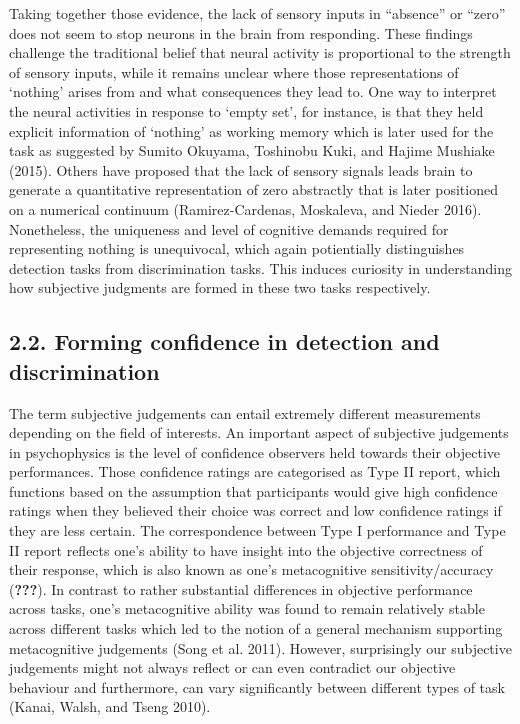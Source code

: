 \documentclass[
]{article}
\begin{document}
Taking together those evidence, the lack of sensory inputs in
``absence'' or ``zero'' does not seem to stop neurons in the brain from
responding. These findings challenge the traditional belief that neural
activity is proportional to the strength of sensory inputs, while it
remains unclear where those representations of `nothing' arises from and
what consequences they lead to. One way to interpret the neural
activities in response to `empty set', for instance, is that they held
explicit information of `nothing' as working memory which is later used
for the task as suggested by Sumito Okuyama, Toshinobu Kuki, and Hajime
Mushiake (2015). Others have proposed that the lack of sensory signals
leads brain to generate a quantitative representation of zero abstractly
that is later positioned on a numerical continuum (Ramirez-Cardenas,
Moskaleva, and Nieder 2016). Nonetheless, the uniqueness and level of
cognitive demands required for representing nothing is unequivocal,
which again potientially distinguishes detection tasks from
discrimination tasks. This induces curiosity in understanding how
subjective judgments are formed in these two tasks respectively.

\hypertarget{forming-confidence-in-detection-and-discrimination}{%
\subsection{2.2. Forming confidence in detection and
discrimination}\label{forming-confidence-in-detection-and-discrimination}}

The term subjective judgements can entail extremely different
measurements depending on the field of interests. An important aspect of
subjective judgements in psychophysics is the level of confidence
observers held towards their objective performances. Those confidence
ratings are categorised as Type II report, which functions based on the
assumption that participants would give high confidence ratings when
they believed their choice was correct and low confidence ratings if
they are less certain. The correspondence between Type I performance and
Type II report reflects one's ability to have insight into the objective
correctness of their response, which is also known as one's
metacognitive sensitivity/accuracy ({\textbf{???}}). In contrast to
rather substantial differences in objective performance across tasks,
one's metacognitive ability was found to remain relatively stable across
different tasks which led to the notion of a general mechanism
supporting metacognitive judgements (Song et al. 2011). However,
surprisingly our subjective judgements might not always reflect or can
even contradict our objective behaviour and furthermore, can vary
significantly between different types of task (Kanai, Walsh, and Tseng
2010).
\end{document}
